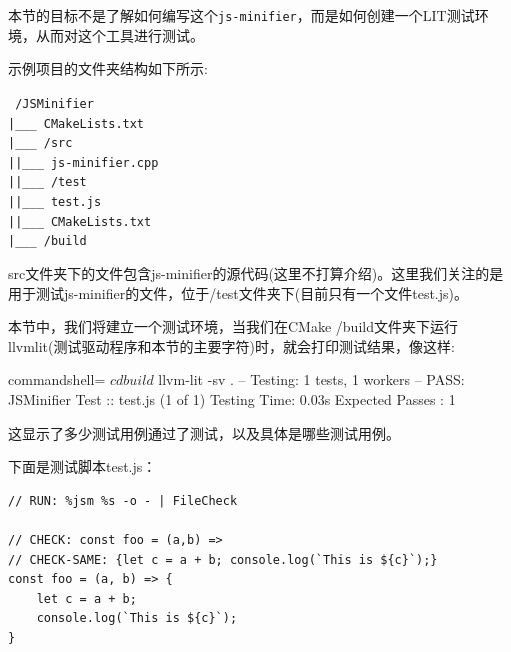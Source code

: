 本节的目标不是了解如何编写这个\texttt{js-minifier}，而是如何创建一个LIT测试环境，从而对这个工具进行测试。

示例项目的文件夹结构如下所示:

\begin{tcolorbox}[colback=white,colframe=black]
\tt
{}
/JSMinifier \\
\hspace*{0.3cm}|\_\_\_ CMakeLists.txt \\
\hspace*{0.3cm}|\_\_\_ /src \\
\hspace*{0.3cm}|\hspace{1cm}|\_\_\_ js-minifier.cpp \\
\hspace*{0.3cm}|\hspace{1cm}|\_\_\_ /test \\
\hspace*{0.3cm}|\hspace{2.3cm}|\_\_\_ test.js \\
\hspace*{0.3cm}|\hspace{2.3cm}|\_\_\_ CMakeLists.txt \\
\hspace*{0.3cm}|\_\_\_ /build
\end{tcolorbox}

src文件夹下的文件包含js-minifier的源代码(这里不打算介绍)。这里我们关注的是用于测试js-minifier的文件，位于/test文件夹下(目前只有一个文件test.js)。

本节中，我们将建立一个测试环境，当我们在CMake /build文件夹下运行llvmlit(测试驱动程序和本节的主要字符)时，就会打印测试结果，像这样:

\begin{tcblisting}{commandshell={}}
$ cd build
$ llvm-lit -sv .
-- Testing: 1 tests, 1 workers –
PASS: JSMinifier Test :: test.js (1 of 1)
Testing Time: 0.03s
  Expected Passes : 1
\end{tcblisting}

这显示了多少测试用例通过了测试，以及具体是哪些测试用例。

下面是测试脚本test.js：

\begin{lstlisting}[style=styleJavaScript]
// RUN: %jsm %s -o - | FileCheck

// CHECK: const foo = (a,b) =>
// CHECK-SAME: {let c = a + b; console.log(`This is ${c}`);}
const foo = (a, b) => {
	let c = a + b;
	console.log(`This is ${c}`);
}
\end{lstlisting}

